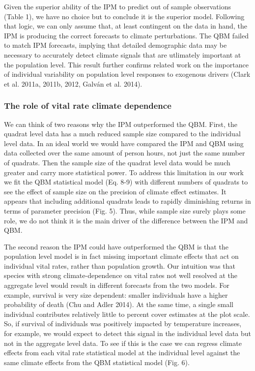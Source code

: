 \documentclass[12pt,]{article}
\begin{document}
Given the superior ability of the IPM to predict out of sample
observations (Table 1), we have no choice but to conclude it is the
superior model. Following that logic, we can only assume that, at least
contingent on the data in hand, the IPM is producing the correct
forecasts to climate perturbations. The QBM failed to match IPM
forecasts, implying that detailed demographic data may be necessary to
accurately detect climate signals that are utlimately important at the
population level. This result further confirms related work on the
importance of individual variability on population level responses to
exogenous drivers (Clark et al. 2011a, 2011b, 2012, Galván et al. 2014).

\subsubsection{The role of vital rate climate
dependence}\label{the-role-of-vital-rate-climate-dependence}

We can think of two reasons why the IPM outperformed the QBM. First, the
quadrat level data has a much reduced sample size compared to the
individual level data. In an ideal world we would have compared the IPM
and QBM using data collected over the same amount of person hours, not
just the same number of quadrats. Then the sample size of the quadrat
level data would be much greater and carry more statistical power. To
address this limitation in our work we fit the QBM statistical model
(Eq. 8-9) with different numbers of quadrats to see the effect of sample
size on the precision of climate effect estimates. It appears that
including additional quadrats leads to rapidly diminishing returns in
terms of parameter precision (Fig. 5). Thus, while sample size surely
plays some role, we do not think it is the main driver of the difference
between the IPM and QBM.

The second reason the IPM could have outperformed the QBM is that the
population level model is in fact missing important climate effects that
act on individual vital rates, rather than population growth. Our
intuition was that species with strong climate-dependence on vital rates
not well resolved at the aggregate level would result in different
forecasts from the two models. For example, survival is very size
dependent: smaller individuals have a higher probability of death (Chu
and Adler 2014). At the same time, a single small individual contributes
relatively little to percent cover estimates at the plot scale. So, if
survival of individuals was positively impacted by temperature
increases, for example, we would expect to detect this signal in the
individual level data but not in the aggregate level data. To see if
this is the case we can regress climate effects from each vital rate
statistical model at the individual level against the same climate
effects from the QBM statistical model (Fig. 6).
\end{document}
